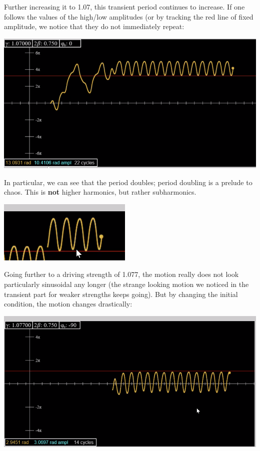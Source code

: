 \documentclass[../PHYS306Notes.tex]{subfiles}
\begin{document}
Further increasing it to 1.07, this transient period continues to increase. If one follows the values of the high/low amplitudes (or by tracking the red line of fixed amplitude, we notice that they do not immediately repeat: 
\begin{center}
    \includegraphics[scale=0.5]{Lecture-32/l32-img4.png}
\end{center}
In particular, we can see that the period doubles; period doubling is a prelude to chaos. This is \textbf{not} higher harmonics, but rather subharmonics.
\begin{center}
    \includegraphics[scale=1]{Lecture-32/l32-img5.png}
\end{center}
Going further to a driving strength of 1.077, the motion really does not look particularly sinusoidal any longer (the strange looking motion we noticed in the transient part for weaker strengths keeps going). But by changing the initial condition, the motion changes drastically:
\begin{center}
    \includegraphics[scale=0.5]{Lecture-32/l32-img6.png}
\end{center}
\end{document}
